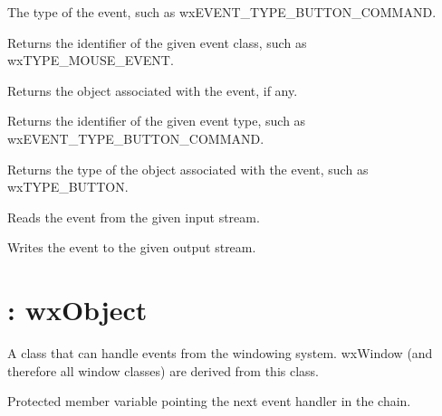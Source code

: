 The type of the event, such as wxEVENT\_TYPE\_BUTTON\_COMMAND.



Returns the identifier of the given event class,
such as wxTYPE\_MOUSE\_EVENT.



Returns the object associated with the
event, if any.



Returns the identifier of the given event type,
such as wxEVENT\_TYPE\_BUTTON\_COMMAND.



Returns the type of the object associated with the
event, such as wxTYPE\_BUTTON.



Reads the event from the given input stream.



Writes the event to the given output stream.

\section{: wxObject}\label{wxevthandler}


A class that can handle events from the windowing system.
wxWindow (and therefore all window classes) are derived from
this class.



Protected member variable pointing the next event handler in the chain.


